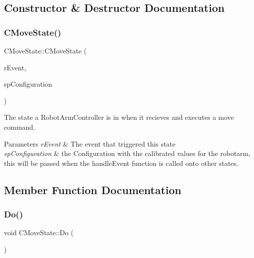 \subsection{Constructor \& Destructor Documentation}
\mbox{\label{classCMoveState_a3b1e230eb78db6e622687ba3b73db8e4}} 
\subsubsection{\texorpdfstring{C\+Move\+State()}{CMoveState()}}
{\footnotesize\ttfamily C\+Move\+State\+::\+C\+Move\+State (\begin{DoxyParamCaption}\item[{\hyperlink{classCEvent}{C\+Event} \&}]{r\+Event,  }\item[{std\+::shared\+\_\+ptr$<$ \hyperlink{classCConfiguration}{C\+Configuration} $>$}]{sp\+Configuration }\end{DoxyParamCaption})}



The state a Robot\+Arm\+Controller is in when it recieves and executes a move command. 


\begin{DoxyParams}{Parameters}
{\em r\+Event} & The event that triggered this state \\
\hline
{\em sp\+Configuration} & the Configuration with the calibrated values for the robotarm, this will be passed when the handle\+Event function is called onto other states. \\
\hline
\end{DoxyParams}


\subsection{Member Function Documentation}
\mbox{\label{classCMoveState_acd364df1357b25ee616a7444116cf9f6}} 
\subsubsection{\texorpdfstring{Do()}{Do()}}
{\footnotesize\ttfamily void C\+Move\+State\+::\+Do (\begin{DoxyParamCaption}{ }\end{DoxyParamCaption})\hspace{0.3cm}{\ttfamily [virtual]}}



